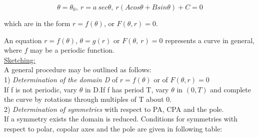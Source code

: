 \documentclass[11pt]{amsbook}
\begin{document}
    \begin{equation*}
        \theta = \theta_{0},\ r=a\ sec\theta,\ r(Acos\theta + Bsin\theta) + C =0
    \end{equation*}
    
    \hfill
    
    \begin{flushleft}
    which are in the form $r=f(\theta)$, or $F(\theta,r)=0$.
    \end{flushleft}
    
    \hfill
    
    An equation $r=f(\theta)$, $\theta=g(r)$ or $F(\theta,\ r)=0$ represents a curve in general, where $f$ may be a periodic function. \\
    
    \underline{Sketching:} \\
    
    A general procedure may be outlined as follows: \\
    
    1) \emph{Determination of the domain D} of $r=f(\theta)$ or of $F(\theta,r)=0$ \\
    
    If f is not periodic, vary $\theta$ in D.If f has period T, vary $\theta$ in $(0, T)$ and complete the curve by rotations through multiples of T about 0. \\
    
    2) \emph{Determination of symmetries} with respect to PA, CPA and the pole. \\
    
    If a symmetry exists the domain is reduced. Conditions for symmetries with respect to polar, copolar axes and the pole are given in following table:
    
\end{document}
